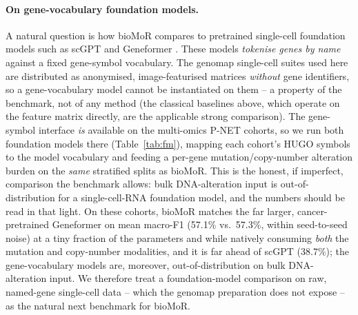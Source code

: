 \documentclass[letterpaper]{article}
\begin{document}
\paragraph{On gene-vocabulary foundation models.}
A natural question is how bioMoR compares to pretrained single-cell foundation models such
as scGPT \cite{cui2024scgpt} and Geneformer \cite{theodoris2023transfer}. These models
\emph{tokenise genes by name} against a fixed gene-symbol vocabulary. The genomap
single-cell suites used here are distributed as anonymised, image-featurised matrices
\emph{without} gene identifiers, so a gene-vocabulary model cannot be instantiated on
them -- a property of the benchmark, not of any method (the classical baselines above,
which operate on the feature matrix directly, are the applicable strong comparison). The
gene-symbol interface \emph{is} available on the multi-omics P-NET cohorts, so we run both
foundation models there (Table~\ref{tab:fm}), mapping each cohort's HUGO symbols to the
model vocabulary and feeding a per-gene mutation/copy-number alteration burden on the
\emph{same} stratified splits as bioMoR. This is the honest, if imperfect, comparison the
benchmark allows: bulk DNA-alteration input is out-of-distribution for a single-cell-RNA
foundation model, and the numbers should be read in that light. On these cohorts,
bioMoR matches the far larger, cancer-pretrained Geneformer on mean macro-F1 (57.1\% vs.\ 57.3\%, within seed-to-seed noise) at a tiny fraction of the parameters and while natively consuming \emph{both} the mutation and copy-number modalities, and it is far ahead of scGPT (38.7\%); the gene-vocabulary models are, moreover, out-of-distribution on bulk DNA-alteration input. We therefore treat a foundation-model comparison on raw, named-gene
single-cell data -- which the genomap preparation does not expose -- as the natural next
benchmark for bioMoR.


\begin{table}[t]
\centering
{}
\caption{\textbf{bioMoR vs.\ non-transformer baselines} (macro-F1, mean$\pm$SD over the same
5 CV folds): a linear ANOVA$\to$PCA$\to$logistic pipeline, a Random Forest, and a
Nearest-Centroid classifier, on the identical StratifiedKFold-5 (seed 42) splits as bioMoR.
\emph{Auto-populates from \texttt{results\_cv5/baselines/} as folds land.}}
\label{tab:baselines}
\end{table}
\end{document}
